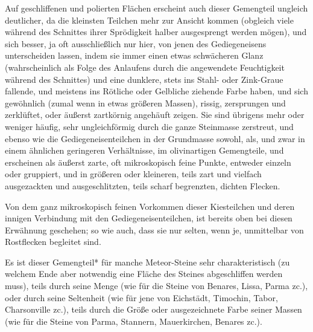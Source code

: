\documentclass[a4paper, 11pt, oneside, german]{article}
\begin{document}
Auf geschliffenen und polierten Flächen erscheint auch dieser Gemengteil ungleich deutlicher, da die kleinsten Teilchen mehr zur Ansicht kommen (obgleich viele während des Schnittes ihrer Sprödigkeit halber ausgesprengt werden mögen), und sich besser, ja oft ausschließlich nur hier, von jenen des Gediegeneisens unterscheiden lassen, indem sie immer einen etwas schwächeren Glanz (wahrscheinlich als Folge des Anlaufens durch die angewendete Feuchtigkeit während des Schnittes) und eine dunklere, stets ins Stahl- oder Zink-Graue fallende, und meistens ins Rötliche oder Gelbliche ziehende Farbe haben, und sich gewöhnlich (zumal wenn in etwas größeren Massen), rissig, zersprungen und zerklüftet, oder äußerst zartkörnig angehäuft zeigen. Sie sind übrigens mehr oder weniger häufig, sehr ungleichförmig durch die ganze Steinmasse zerstreut, und ebenso wie die Gediegeneisenteilchen in der Grundmasse sowohl, als, und zwar in einem ähnlichen geringeren Verhältnisse, im olivinartigen Gemengteile, und erscheinen als äußerst zarte, oft mikroskopisch feine Punkte, entweder einzeln oder gruppiert, und in größeren oder kleineren, teils zart und vielfach ausgezackten und ausgeschlitzten, teils scharf begrenzten, dichten Flecken.

Von dem ganz mikroskopisch feinen Vorkommen dieser Kiesteilchen und deren innigen Verbindung mit den Gediegeneisenteilchen, ist bereits oben bei diesen Erwähnung geschehen; so wie auch, dass sie nur selten, wenn je, unmittelbar von Rostflecken begleitet sind.

Es ist dieser Gemengteil* für manche Meteor-Steine sehr charakteristisch (zu welchem Ende aber notwendig eine Fläche des Steines abgeschliffen werden muss), teils durch seine Menge (wie für die Steine von Benares, Lissa, Parma zc.), oder durch seine Seltenheit (wie für jene von Eichstädt, Timochin, Tabor, Charsonville zc.), teils durch die Größe oder ausgezeichnete Farbe seiner Massen (wie für die Steine von Parma, Stannern, Mauerkirchen, Benares zc.).
\end{document}
